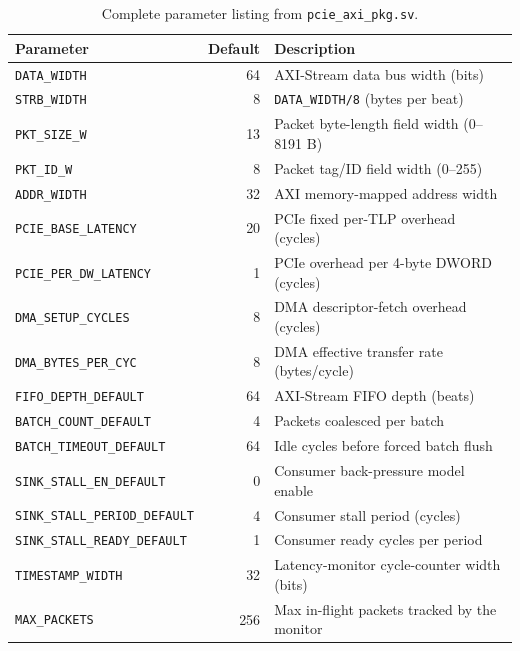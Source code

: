 \begin{table}[htbp]
\centering
\begin{tabular}{@{}lrl@{}}
\toprule
\textbf{Parameter} & \textbf{Default} & \textbf{Description} \\
\midrule
\texttt{DATA\_WIDTH}              & 64   & AXI-Stream data bus width (bits) \\
\texttt{STRB\_WIDTH}               & 8    & \texttt{DATA\_WIDTH/8} (bytes per beat) \\
\texttt{PKT\_SIZE\_W}              & 13   & Packet byte-length field width (0--8191 B) \\
\texttt{PKT\_ID\_W}                & 8    & Packet tag/ID field width (0--255) \\
\texttt{ADDR\_WIDTH}               & 32   & AXI memory-mapped address width \\
\texttt{PCIE\_BASE\_LATENCY}        & 20   & PCIe fixed per-TLP overhead (cycles) \\
\texttt{PCIE\_PER\_DW\_LATENCY}     & 1    & PCIe overhead per 4-byte DWORD (cycles) \\
\texttt{DMA\_SETUP\_CYCLES}         & 8    & DMA descriptor-fetch overhead (cycles) \\
\texttt{DMA\_BYTES\_PER\_CYC}       & 8    & DMA effective transfer rate (bytes/cycle) \\
\texttt{FIFO\_DEPTH\_DEFAULT}       & 64   & AXI-Stream FIFO depth (beats) \\
\texttt{BATCH\_COUNT\_DEFAULT}      & 4    & Packets coalesced per batch \\
\texttt{BATCH\_TIMEOUT\_DEFAULT}    & 64   & Idle cycles before forced batch flush \\
\texttt{SINK\_STALL\_EN\_DEFAULT}   & 0    & Consumer back-pressure model enable \\
\texttt{SINK\_STALL\_PERIOD\_DEFAULT}& 4   & Consumer stall period (cycles) \\
\texttt{SINK\_STALL\_READY\_DEFAULT}& 1    & Consumer ready cycles per period \\
\texttt{TIMESTAMP\_WIDTH}          & 32   & Latency-monitor cycle-counter width (bits) \\
\texttt{MAX\_PACKETS}              & 256  & Max in-flight packets tracked by the monitor \\
\bottomrule
\end{tabular}
\caption{Complete parameter listing from \texttt{pcie\_axi\_pkg.sv}.}
\label{tab:appA_params}
\end{table}

